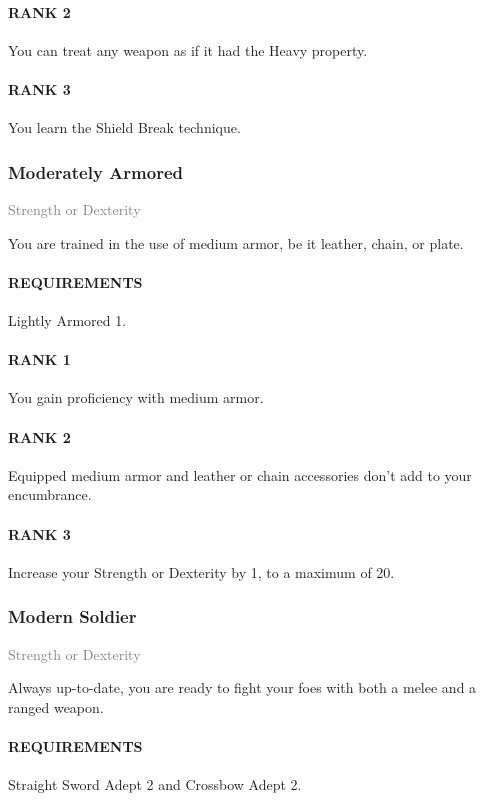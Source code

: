 \paragraph{RANK 2} You can treat any weapon as if it had the Heavy property.
\paragraph{RANK 3} You learn the Shield Break technique.

\subsubsection{Moderately Armored} \label{feat::moderatelyarmored}
\small{\textcolor{gray}{Strength or Dexterity}}

\normalsize
You are trained in the use of medium armor, be it leather, chain, or plate.
\paragraph{REQUIREMENTS} Lightly Armored 1.
\paragraph{RANK 1} You gain proficiency with medium armor.
\paragraph{RANK 2} Equipped medium armor and leather or chain accessories don't add to your encumbrance.
\paragraph{RANK 3} Increase your Strength or Dexterity by 1, to a maximum of 20.

\subsubsection{Modern Soldier} \label{feat::modernsoldier}
\small{\textcolor{gray}{Strength or Dexterity}}

\normalsize
Always up-to-date, you are ready to fight your foes with both a melee and a ranged weapon.
\paragraph{REQUIREMENTS} Straight Sword Adept 2 and Crossbow Adept 2.
